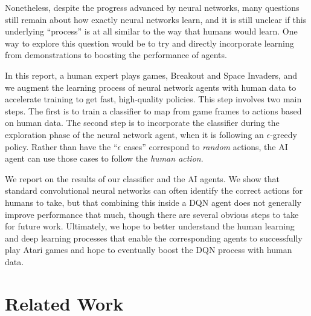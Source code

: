 \documentclass[letterpaper, 10pt, conference]{ieeeconf}
\begin{document}
Nonetheless, despite the progress advanced by neural networks, many questions
still remain about how exactly neural networks learn, and it is still unclear if
this underlying ``process'' is at all similar to the way that humans would
learn. One way to explore this question would be to try and directly incorporate
learning from demonstrations to boosting the performance of agents.

In this report, a human expert plays games, Breakout and Space Invaders, and we
augment the learning process of neural network agents with human data to
accelerate training to get fast, high-quality policies. This step involves two
main steps. The first is to train a classifier to map from game frames to
actions based on human data. The second step is to incorporate the classifier
during the exploration phase of the neural network agent, when it is following
an $\epsilon$-greedy policy. Rather than have the ``$\epsilon$ cases''
correspond to \emph{random} actions, the AI agent can use those cases to follow
the \emph{human action}.

We report on the results of our classifier and the AI agents. We show that
standard convolutional neural networks can often identify the correct actions
for humans to take, but that combining this inside a DQN agent does not
generally improve performance that much, though there are several obvious
steps to take for future work. Ultimately, we hope to better understand the
human learning and deep learning processes that enable the corresponding
agents to successfully play Atari games and hope to eventually boost the DQN
process with human data.


\section{Related Work}\label{sec:related_work}
\end{document}
